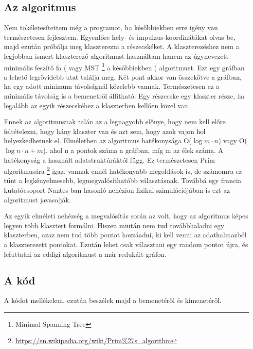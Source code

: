 \documentclass[a4paper,12pt]{article}
\begin{document}
\subsection{ Az algoritmus}
\par Nem tökéletesítettem még a programot, ha későbbiekben erre igény van természetesen fejlesztem. Egyenlőre hely- és impulzus-koordinátákat
olvas be, majd ezután próbálja meg klaszterezni a részecskéket. A klaszterezéshez nem a legjobban ismert klaszterező algoritmust
használtam hanem az úgynevezett minimális feszítő fa ( vagy MST \footnote{Minimal Spanning Tree} a későbbiekben ) algoritmust. Ezt egy 
gráfban a lehető legrövidebb utat találja meg. Két pont akkor van összekötve a gráfban, ha egy adott minimum távolságnál közelebb vannak.
Természetesen ez a minimális távolság is a bemenetről állítható. Egy részecske egy klaszter része, ha legalább az egyik részecskéhez a
klaszterben kellően közel van. 
\par Ennek az algoritmusnak talán az a legnagyobb előnye, hogy nem kell előre feltételezni, hogy hány klaszter van és azt sem, hogy 
azok vajon hol helyezkedhetnek el. Elméletben az algoritmus hatékonysága O($\log{m}\cdot n$) vagy O($\log{n}\cdot n + m$), ahol n a pontok
száma a gráfban, míg m az élek száma. A hatékonyság a használt adatstruktúráktól függ. Ez természetesen Prim algoritmusára \footnote{\url{https://en.wikipedia.org/wiki/Prim\%27s_algorithm}}
igaz, vannak ennél hatékonyabb megoldások is, de számomra ez tűnt a legkényelmesebb, legmegvalósíthatóbb választásnak. Továbbá egy francia 
kutatócsoport Nantes-ban hasonló nehézion fizikai szimulációjában is ezt az algoritmust javasolják.
\par  Az egyik elméleti nehézség a megvalósítás során az volt, hogy az algoritmus képes legyen több klasztert formálni. Hiszen miután 
nem tud továbbhaladni egy klaszterben, azaz nem tud több pontot hozzáadni, ki kell venni az adathalmazból a klaszterezett pontokat. Ezután lehet csak választani egy random pontot újra, és lefuttatni az eddigi algoritmust a már redukált gráfon.
\subsection{ A kód}
\par A kódot mellékelem, ezután beszélek majd a bemenetéről és kimenetéről.

\end{document}

